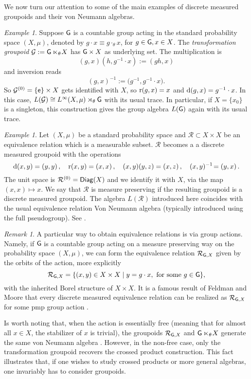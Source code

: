\documentclass[a4paper,11pt]{article}
\numberwithin{equation}{section}
\theoremstyle{definition}
\theoremstyle{remark}
\newtheorem{rem}[thm]{Remark}
\newtheorem{ex}[thm]{Example}
\numberwithin{equation}{section}
\newcommand{\rG}{\mathcal{G}}
\def\e{{\sf e}}
\def\r{{\rm r}}
\def\d{{\rm d}}
\def\G{{\sf G}}
\numberwithin{equation}{section}
\begin{document}
We now turn our attention to some of the main examples of discrete measured groupoids and their von Neumann algebras.


\begin{ex}\label{transformation}
Suppose $\G$ is a countable group acting in the standard probability space $(X,\mu)$, denoted by $g\cdot x\equiv g\cdot_\theta x$, for $g\in\G, x\in X$. The {\it transformation groupoid} $\rG:=\G\ltimes_\theta\!X$ has $\G\times X$ as underlying set. The multiplication is $$(g,x)(h,g^{-1}\cdot x):=(gh,x)$$ and inversion reads $$(g,x)^{-1}:=\big(g^{-1}\!,g^{-1}\cdot x\big).$$ So $\rG^{(0)}=\{\e\}\times X$ gets identified with $X$, so $\r(g,x)=x$ and $\d(g,x)=g^{-1}\cdot x$. In this case, $L(\rG)\cong L^\infty(X,\mu)\rtimes_\theta\G$ with its usual trace. In particular, if $X=\{x_0\}$ is a singleton, this construction gives the group algebra $L(\G)$ again with its usual trace.
\end{ex}

\begin{ex}\label{equivrel}
Let $(X,\mu)$ be a standard probability space and $\mathcal R\subset X\times X$ be an equivalence relation which is a measurable subset. $\mathcal R$ becomes a a discrete measured groupoid with the operations 
$$
\d(x,y)=(y,y)\,,\quad \r(x,y)=(x,x)\,,\quad (x,y)(y,z)=(x,z)\,,\quad(x,y)^{-1}\!=(y,x)\,.
$$
The unit space is $\mathcal R^{(0)}={\sf Diag}(X)$ and we identify it with $X$, via the map $(x,x)\mapsto x$. We say that $\mathcal R$ is measure preserving if the resulting groupoid is a discrete measured groupoid. The algebra $L(\mathcal R)$ introduced here coincides with the usual equivalence relation Von Neumann algebra (typically introduced using the full pseudogroup). See \textcite[Section 2.2]{hoff:16}. 
\end{ex} 

\begin{rem}\label{nonfree}
    A particular way to obtain equivalence relations is via group actions. Namely, if $\G$ is a countable group acting on a measure preserving way on the probability space $(X,\mu)$, we can form the equivalence relation $\mathcal R_{\G,X}$ given by the orbits of the action, more explicitly
    $$
    \mathcal R_{\G,X}=\{(x,y)\in X\times X \mid y=g\cdot x, \textup{ for some }g\in\G\},
    $$ 
    with the inherited Borel structure of $X\times X$. It is a famous result of Feldman and Moore that every discrete measured equivalence relation can be realized as $\mathcal R_{\G,X}$ for some pmp group action \cite[Theorem 1]{FM1:77}.
    
    Is worth noting that, when the action is essentially free (meaning that for almost all $x\in X$, the stabilizer of $x$ is trivial), the groupoids $\mathcal R_{\G,X}$ and $\G\ltimes_\theta\!X$ generate the same von Neumann algebra \cite{FM2:77}. However, in the non-free case, only the transformation groupoid recovers the crossed product construction. This fact illustrates that, if one wishes to study crossed products or more general algebras, one invariably has to consider groupoids.
\end{rem}
\end{document}
